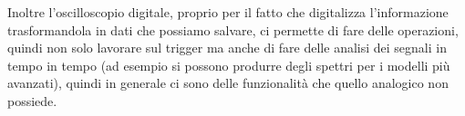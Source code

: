 Inoltre l'oscilloscopio digitale, proprio per il fatto che digitalizza l'informazione trasformandola in dati che possiamo salvare, ci permette di fare delle operazioni, quindi non solo lavorare sul trigger ma anche di fare delle analisi dei segnali in tempo in tempo (ad esempio si possono produrre degli spettri per i modelli più avanzati), quindi in generale ci sono delle funzionalità che quello analogico non possiede.
